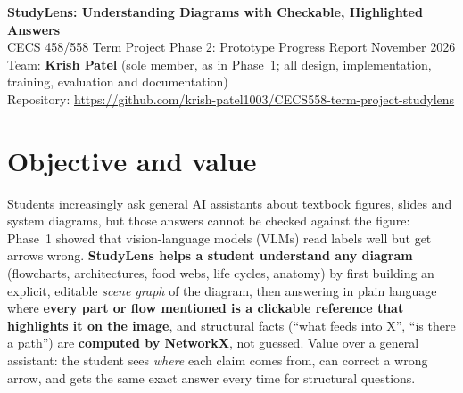 \documentclass[10pt,letterpaper]{article}
\begin{document}
\begin{center}
{\large\bfseries StudyLens: Understanding Diagrams with Checkable, Highlighted Answers}\\[2pt]
CECS 458/558 Term Project \textperiodcentered{} Phase 2: Prototype Progress Report \textperiodcentered{} November 2026\\[1pt]
Team: \textbf{Krish Patel} (sole member, as in Phase~1; all design, implementation, training, evaluation and documentation)\\[1pt]
Repository: \url{https://github.com/krish-patel1003/CECS558-term-project-studylens}
\end{center}

\section{Objective and value}
Students increasingly ask general AI assistants about textbook figures, slides and system diagrams, but those answers cannot be checked against the figure: Phase~1 showed that vision-language models (VLMs) read labels well but get arrows wrong. \textbf{StudyLens helps a student understand any diagram} (flowcharts, architectures, food webs, life cycles, anatomy) by first building an explicit, editable \emph{scene graph} of the diagram, then answering in plain language where \textbf{every part or flow mentioned is a clickable reference that highlights it on the image}, and structural facts (``what feeds into X'', ``is there a path'') are \textbf{computed by NetworkX}, not guessed. Value over a general assistant: the student sees \emph{where} each claim comes from, can correct a wrong arrow, and gets the same exact answer every time for structural questions.
\end{document}
